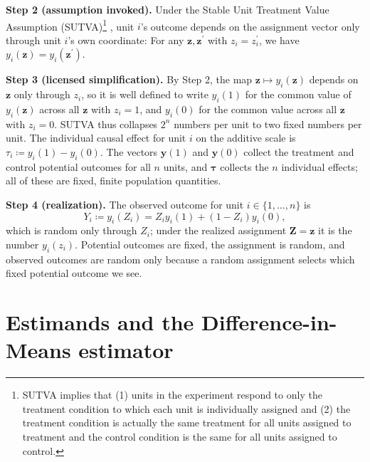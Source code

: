 \documentclass[12pt,leqno]{article}
\theoremstyle{newstyle}
\newcommand{\bZ}{\bm{Z}}   \newcommand{\bz}{\bm{z}}   %
\newcommand{\po}[2]{y_{#1}(#2)}     %
\newcommand{\pov}[1]{\bm{y}(#1)}    %
\begin{document}
\textbf{Step 2 (assumption invoked).} Under the Stable Unit Treatment Value Assumption (SUTVA)\footnote{SUTVA implies that (1) units in the experiment respond to only the treatment condition to which each unit is individually assigned and (2) the treatment condition is actually the same treatment for all units assigned to treatment and the control condition is the same for all units assigned to control.} \citep{cox1958a,rubin1980b,rubin1986}, unit $i$'s outcome depends on the assignment vector only through unit $i$'s own coordinate: For any $\bz, \bz^{\prime}$ with $z_i = z_i^{\prime}$, we have $\po{i}{\bz} = \po{i}{\bz^{\prime}}$.

\textbf{Step 3 (licensed simplification).} By Step 2, the map $\bz \mapsto \po{i}{\bz}$ depends on $\bz$ only through $z_i$, so it is well defined to write $\po{i}{1}$ for the common value of $\po{i}{\bz}$ across all $\bz$ with $z_i = 1$, and $\po{i}{0}$ for the common value across all $\bz$ with $z_i = 0$. SUTVA thus collapses $2^n$ numbers per unit to two fixed numbers per unit. The individual causal effect for unit $i$ on the additive scale is $\tau_i \coloneqq \po{i}{1} - \po{i}{0}$. The vectors $\pov{1}$ and $\pov{0}$ collect the treatment and control potential outcomes for all $n$ units, and $\bm{\tau}$ collects the $n$ individual effects; all of these are fixed, finite population quantities.

\textbf{Step 4 (realization).} The observed outcome for unit $i \in \{1, \ldots, n\}$ is
\begin{equation*}
Y_i \coloneqq \po{i}{Z_i} = Z_i \po{i}{1} + \left(1 - Z_i\right) \po{i}{0},
\end{equation*}
which is random only through $Z_i$; under the realized assignment $\bZ = \bz$ it is the number $\po{i}{z_i}$. Potential outcomes are fixed, the assignment is random, and observed outcomes are random only because a random assignment selects which fixed potential outcome we see.

\section{Estimands and the Difference-in-Means estimator}
\end{document}
